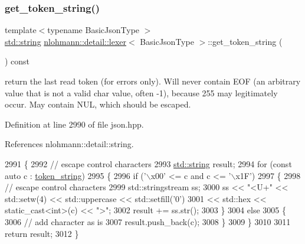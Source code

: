 \subsubsection{\texorpdfstring{get\+\_\+token\+\_\+string()}{get\_token\_string()}}
{\footnotesize\ttfamily template$<$typename Basic\+Json\+Type $>$ \\
\hyperlink{namespacenlohmann_1_1detail_a1ed8fc6239da25abcaf681d30ace4985ab45cffe084dd3d20d928bee85e7b0f21}{std\+::string} \hyperlink{classnlohmann_1_1detail_1_1lexer}{nlohmann\+::detail\+::lexer}$<$ Basic\+Json\+Type $>$\+::get\+\_\+token\+\_\+string (\begin{DoxyParamCaption}{ }\end{DoxyParamCaption}) const\hspace{0.3cm}{\ttfamily [inline]}}

return the last read token (for errors only). Will never contain E\+OF (an arbitrary value that is not a valid char value, often -\/1), because 255 may legitimately occur. May contain N\+UL, which should be escaped. 

Definition at line 2990 of file json.\+hpp.



References nlohmann\+::detail\+::string.


\begin{DoxyCode}
2991     \{
2992         \textcolor{comment}{// escape control characters}
2993         \hyperlink{namespacenlohmann_1_1detail_a1ed8fc6239da25abcaf681d30ace4985ab45cffe084dd3d20d928bee85e7b0f21}{std::string} result;
2994         \textcolor{keywordflow}{for} (\textcolor{keyword}{const} \textcolor{keyword}{auto} c : \hyperlink{classnlohmann_1_1detail_1_1lexer_ad2960e3d54af8fb8d572a8f6f7731d62}{token\_string})
2995         \{
2996             \textcolor{keywordflow}{if} (\textcolor{stringliteral}{'\(\backslash\)x00'} <= c and c <= \textcolor{stringliteral}{'\(\backslash\)x1F'})
2997             \{
2998                 \textcolor{comment}{// escape control characters}
2999                 std::stringstream ss;
3000                 ss << \textcolor{stringliteral}{"<U+"} << std::setw(4) << std::uppercase << std::setfill(\textcolor{charliteral}{'0'})
3001                    << std::hex << static\_cast<int>(c) << \textcolor{stringliteral}{">"};
3002                 result += ss.str();
3003             \}
3004             \textcolor{keywordflow}{else}
3005             \{
3006                 \textcolor{comment}{// add character as is}
3007                 result.push\_back(c);
3008             \}
3009         \}
3010 
3011         \textcolor{keywordflow}{return} result;
3012     \}
\end{DoxyCode}
\mbox{\label{classnlohmann_1_1detail_1_1lexer_a73216fe28e91a0aa3bdae77a89ce554b}} 
